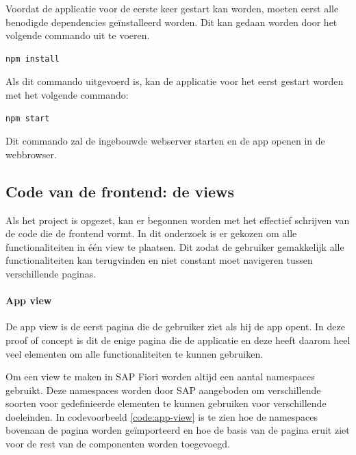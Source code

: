 Voordat de applicatie voor de eerste keer gestart kan worden, moeten eerst alle benodigde dependencies geïnstalleerd worden. Dit kan gedaan worden door het volgende commando uit te voeren.
\begin{lstlisting}[language=bash]
    npm install
\end{lstlisting}

Als dit commando uitgevoerd is, kan de applicatie voor het eerst gestart worden met het volgende commando:
\begin{lstlisting}[language=bash]
    npm start
\end{lstlisting}

Dit commando zal de ingebouwde webserver starten en de app openen in de webbrowser. 

\subsection{Code van de frontend: de views}

Als het project is opgezet, kan er begonnen worden met het effectief schrijven van de code die de frontend vormt. In dit onderzoek is er gekozen om alle functionaliteiten in één view te plaatsen. Dit zodat de gebruiker gemakkelijk alle functionaliteiten kan terugvinden en niet constant moet navigeren tussen verschillende paginas.

\paragraph{App view}

De app view is de eerst pagina die de gebruiker ziet als hij de app opent. In deze proof of concept is dit de enige pagina die de applicatie en deze heeft daarom heel veel elementen om alle functionaliteiten te kunnen gebruiken. 

Om een view te maken in SAP Fiori worden altijd een aantal namespaces gebruikt. Deze namespaces worden door SAP aangeboden om verschillende soorten voor gedefinieerde elementen te kunnen gebruiken voor verschillende doeleinden. In codevoorbeeld \ref{code:app-view} is te zien hoe de namespaces bovenaan de pagina worden geïmporteerd en hoe de basis van de pagina eruit ziet voor de rest van de componenten worden toegevoegd.

